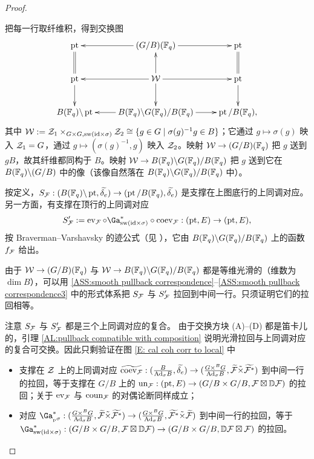 \begin{proof}
\begin{itemize}
\end{itemize}
把每一行取纤维积，得到交换图
\begin{equation*}
\xymatrix{
\on{pt}&\ar[l] (G/B)(\bF_q)\ar[r] & \on{pt}\\
\on{pt}\ar@{=}[u]\ar[d]&\ar[l] \mW \ar[u]\ar[d]\ar[r] & \on{pt}\ar@{=}[u]\ar[d]\\
B(\bF_q)\backslash \on{pt}&\ar[l] B(\bF_q)\backslash G(\bF_q)/B(\bF_q)\ar[r]& \on{pt}/B(\bF_q),
}\end{equation*}
其中 ${\mathcal W}:={\mathcal Z}_1\times_{G\times G, \operatorname{sw}({\operatorname{id}}\times \sigma)}{\mathcal Z}_2\cong\{g\in G\mid \sigma(g)^{-1}g\in B\}$；它通过 $g\mapsto\sigma(g)$ 映入 ${\mathcal Z}_1=G$，通过 $g\mapsto(\sigma(g)^{-1},g)$ 映入 ${\mathcal Z}_2$。映射 ${\mathcal W}\to (G/B)({\mathbb F}_q)$ 把 $g$ 送到 $gB$，故其纤维都同构于 $B$。映射 ${\mathcal W}\to B({\mathbb F}_q)\backslash G({\mathbb F}_q)/B({\mathbb F}_q)$ 把 $g$ 送到它在 $B({\mathbb F}_q)\backslash (G/B)$ 中的像（该像自然落在 $B({\mathbb F}_q)\backslash G({\mathbb F}_q)/B({\mathbb F}_q)$ 中）。

按定义，$S_{{\mathcal F}}: (B({\mathbb F}_q)\backslash \operatorname{pt},\widetilde{\delta_e})\to (\operatorname{pt}/B({\mathbb F}_q),\widetilde{\delta_e})$ 是支撑在上图底行的上同调对应。另一方面，有支撑在顶行的上同调对应
$$S'_\mF:=\on{ev}_{\mF}\circ \Ga_{\on{sw}(\id\times\sigma)}^* \circ\on{coev}_{\mF}: (\on{pt},E)\to(\on{pt},E),$$
按 Braverman–Varshavsky 的迹公式（见 \cite[引理 A.2.22]{XZ}），它由 $B({\mathbb F}_q)\backslash G({\mathbb F}_q)/B({\mathbb F}_q)$ 上的函数 $f_{\mathcal F}$ 给出。

由于 ${\mathcal W}\to (G/B)({\mathbb F}_q)$ 与 ${\mathcal W}\to B({\mathbb F}_q)\backslash G({\mathbb F}_q)/B({\mathbb F}_q)$ 都是等维光滑的（维数为 $\dim B$），可以用 \eqref{ASS:smooth pullback correspondence}--\eqref{ASS:smooth pullback correspondence3} 中的形式体系把 $S_{\mathcal F}$ 与 $S'_{\mathcal F}$ 拉回到中间一行。只须证明它们的拉回相等。

注意 $S_{{\mathcal F}}$ 与 $S'_{{\mathcal F}}$ 都是三个上同调对应的复合。
由于交换方块 (A)–(D) 都是笛卡儿的，引理 \ref{AL:pullback compatible with composition} 说明光滑拉回与上同调对应的复合可交换。因此只剩验证在图 \eqref{E: cal coh corr to local} 中
\begin{itemize}
\item 支撑在 ${\mathcal Z}$ 上的上同调对应 $\widetilde{\operatorname{coev}_{\mathcal F}}: (\frac{B}{{\operatorname{Ad}}_\sigma B}, \widetilde{\delta_e})\to (\frac{G\times^BG}{{\operatorname{Ad}}_\sigma B}, \widetilde{{\mathcal F}}\tilde\times \widetilde{{\mathcal F}^*})$ 到中间一行的拉回，等于支撑在 $G/B$ 上的 $\operatorname{un}_{{\mathcal F}}: (\operatorname{pt},E)\to (G/B\times G/B, {\mathcal F}\boxtimes {\mathbb D}{\mathcal F})$ 的拉回；关于 $\operatorname{ev}_{\mathcal F}$ 与 $\operatorname{coun}_{{\mathcal F}}$ 的对偶论断同样成立；
\item 对应 $\Ga_{\pFr}^*: (\frac{G\times^BG}{\Ad_\sigma B}, \widetilde{\mF}\tilde\times\widetilde{\mF^*})\to (\frac{G\times^BG}{\Ad_\sigma B}, \widetilde{\mF^*}\tilde\times\widetilde{\mF})$ 到中间一行的拉回，等于 $\Ga_{\on{sw}(\id\times\sigma)}^*: (G/B\times G/B, \mF\boxtimes \bD \mF)\to (G/B\times G/B, \bD \mF\boxtimes \mF)$ 的拉回。
\end{itemize}
\end{proof}
